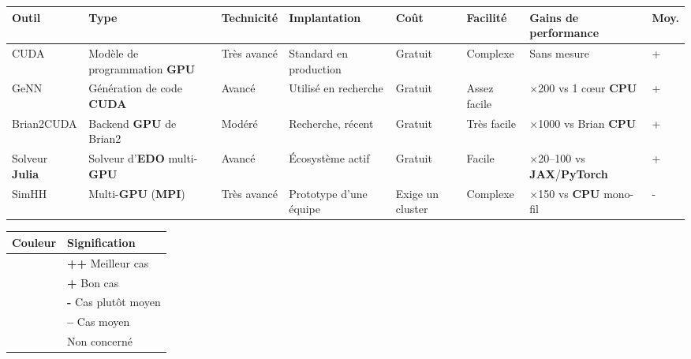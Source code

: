 \documentclass{report}
\begin{document}
{\setlength{\tabcolsep}{3pt}\footnotesize
\begin{tabular}{|p{1.8cm}|p{1.5cm}|p{1.5cm}|p{1.85cm}|p{1.05cm}|p{1.35cm}|p{2.1cm}|p{0.95cm}|}
\hline
\rowcolor{gray!15}
\scriptsize\textbf{Outil} & \scriptsize\textbf{Type} & \scriptsize\textbf{Technicité} & \scriptsize\textbf{Implantation} & \scriptsize\textbf{Coût} & \scriptsize\textbf{Facilité} & \scriptsize\textbf{Gains de performance} & \scriptsize\textbf{Moy.} \\ \hline

CUDA \cite{nickolls2008} & Modèle de programmation \textbf{GPU} &
\cellcolor{bmBest}Très avancé &
\cellcolor{bmBest}Standard en production &
\cellcolor{bmBest}Gratuit &
\cellcolor{bmLow}Complexe &
Sans mesure &
\cellcolor{bmGood}+ \\ \hline

GeNN \cite{yavuz2016} & Génération de code \textbf{CUDA} &
\cellcolor{bmGood}Avancé &
\cellcolor{bmGood}Utilisé en recherche &
\cellcolor{bmBest}Gratuit &
\cellcolor{bmGood}Assez facile &
\cellcolor{bmGood}$\times$200 vs 1 cœur \textbf{CPU} &
\cellcolor{bmGood}+ \\ \hline

Brian2CUDA \cite{alevi2022} & Backend \textbf{GPU} de Brian2 &
\cellcolor{bmMid}Modéré &
\cellcolor{bmMid}Recherche, récent &
\cellcolor{bmBest}Gratuit &
\cellcolor{bmBest}Très facile &
\cellcolor{bmBest}$\times$1000 vs Brian \textbf{CPU} &
\cellcolor{bmGood}+ \\ \hline

Solveur \textbf{Julia} \cite{utkarsh2024} & Solveur d'\textbf{EDO} multi-\textbf{GPU} &
\cellcolor{bmGood}Avancé &
\cellcolor{bmGood}Écosystème actif &
\cellcolor{bmBest}Gratuit &
\cellcolor{bmGood}Facile &
\cellcolor{bmBest}$\times$20--100 vs \textbf{JAX}/\allowbreak\textbf{PyTorch} &
\cellcolor{bmGood}+ \\ \hline

SimHH \cite{engelen2025} & Multi-\textbf{GPU} (\textbf{MPI}) &
\cellcolor{bmBest}Très avancé &
\cellcolor{bmMid}Prototype d'une équipe &
\cellcolor{bmLow}Exige un cluster &
\cellcolor{bmLow}Complexe &
\cellcolor{bmBest}$\times$150 vs \textbf{CPU} mono-fil &
\cellcolor{bmMid}- \\ \hline

\end{tabular}}

\medskip

\begin{tabular}{|p{1.5cm}|p{6cm}|}
\hline
\textbf{Couleur} & \textbf{Signification} \\ \hline
\cellcolor{bmBest} & \textbf{++} Meilleur cas \\ \hline
\cellcolor{bmGood} & \textbf{+} Bon cas \\ \hline
\cellcolor{bmMid} & \textbf{-} Cas plutôt moyen \\ \hline
\cellcolor{bmLow} & \textbf{--} Cas moyen \\ \hline
& Non concerné \\ \hline
\end{tabular}
\end{document}
